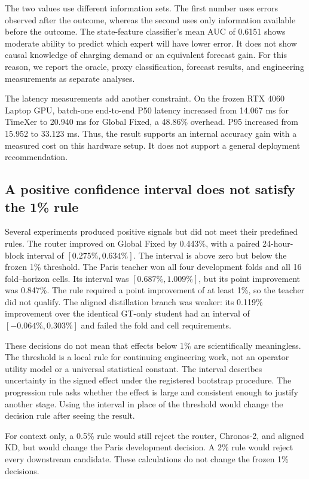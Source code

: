 The two values use different information sets.  The first number uses errors observed after the outcome, whereas the second uses only information available before the outcome.  The state-feature classifier's mean AUC of 0.6151 shows moderate ability to predict which expert will have lower error.  It does not show causal knowledge of charging demand or an equivalent forecast gain.  For this reason, we report the oracle, proxy classification, forecast results, and engineering measurements as separate analyses.

The latency measurements add another constraint.  On the frozen RTX 4060 Laptop GPU, batch-one end-to-end P50 latency increased from 14.067 ms for TimeXer to 20.940 ms for Global Fixed, a 48.86\% overhead.  P95 increased from 15.952 to 33.123 ms.  Thus, the result supports an internal accuracy gain with a measured cost on this hardware setup.  It does not support a general deployment recommendation.

\subsection{A positive confidence interval does not satisfy the 1\% rule}

Several experiments produced positive signals but did not meet their predefined rules.  The router improved on Global Fixed by 0.443\%, with a paired 24-hour-block interval of $[0.275\%,0.634\%]$.  The interval is above zero but below the frozen 1\% threshold.  The Paris teacher won all four development folds and all 16 fold--horizon cells.  Its interval was $[0.687\%,1.009\%]$, but its point improvement was 0.847\%.  The rule required a point improvement of at least 1\%, so the teacher did not qualify.  The aligned distillation branch was weaker: its 0.119\% improvement over the identical GT-only student had an interval of $[-0.064\%,0.303\%]$ and failed the fold and cell requirements.

These decisions do not mean that effects below 1\% are scientifically meaningless.  The threshold is a local rule for continuing engineering work, not an operator utility model or a universal statistical constant.  The interval describes uncertainty in the signed effect under the registered bootstrap procedure.  The progression rule asks whether the effect is large and consistent enough to justify another stage.  Using the interval in place of the threshold would change the decision rule after seeing the result.

For context only, a 0.5\% rule would still reject the router, Chronos-2, and aligned KD, but would change the Paris development decision.  A 2\% rule would reject every downstream candidate.  These calculations do not change the frozen 1\% decisions.

